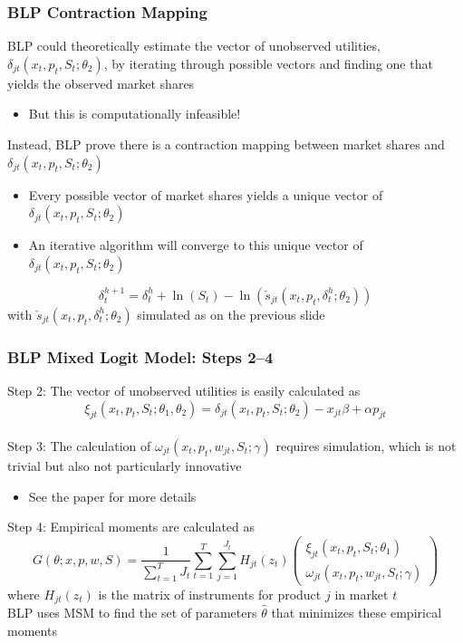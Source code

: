 \documentclass{beamer}
\begin{document}
\begin{frame}\frametitle{BLP Contraction Mapping}
    BLP could theoretically estimate the vector of unobserved utilities, $\delta_{jt}(x_t, p_t, S_t; \theta_2)$, by iterating through possible vectors and finding one that yields the observed market shares
    \begin{itemize}
        \item But this is computationally infeasible!
    \end{itemize}
    \vspace{2ex}
    Instead, BLP prove there is a contraction mapping between market shares and $\delta_{jt}(x_t, p_t, S_t; \theta_2)$
    \begin{itemize}
        \item Every possible vector of market shares yields a unique vector of $\delta_{jt}(x_t, p_t, S_t; \theta_2)$
        \item An iterative algorithm will converge to this unique vector of $\delta_{jt}(x_t, p_t, S_t; \theta_2)$
    \end{itemize}
    \vspace{2ex}
    $$\delta_t^{h+1} = \delta_t^h + \ln(S_t) - \ln(\check{s}_{jt}(x_t, p_t, \delta_t^h; \theta_2))$$
    with $\check{s}_{jt}(x_t, p_t, \delta_t^h; \theta_2)$ simulated as on the previous slide
\end{frame}

\begin{frame}\frametitle{BLP Mixed Logit Model: Steps 2--4}
    Step 2: The vector of unobserved utilities is easily calculated as
    $$\xi_{jt}(x_t, p_t, S_t; \theta_1, \theta_2) = \delta_{jt}(x_t, p_t, S_t; \theta_2) - x_{jt} \beta + \alpha p_{jt}$$ \\
    \vspace{1ex}
    Step 3: The calculation of $\omega_{jt}(x_t, p_t, w_{jt}, S_t; \gamma)$ requires simulation, which is not trivial but also not particularly innovative
    \begin{itemize}
        \item See the paper for more details
    \end{itemize}
    \vspace{2ex}
    Step 4: Empirical moments are calculated as
    $$G(\theta; x, p, w, S) = \frac{1}{\sum_{t = 1}^T J_t} \sum_{t = 1}^T \sum_{j = 1}^{J_t} H_{jt}(z_t) 
    \begin{pmatrix}
        \xi_{jt}(x_t, p_t, S_t; \theta_1) \\
        \omega_{jt}(x_t, p_t, w_{jt}, S_t; \gamma)
    \end{pmatrix}$$
    where $H_{jt}(z_t)$ is the matrix of instruments for product $j$ in market $t$ \\
    \vspace{2ex}
    BLP uses MSM to find the set of parameters $\hat{\theta}$ that minimizes these empirical moments
\end{frame}
\end{document}
